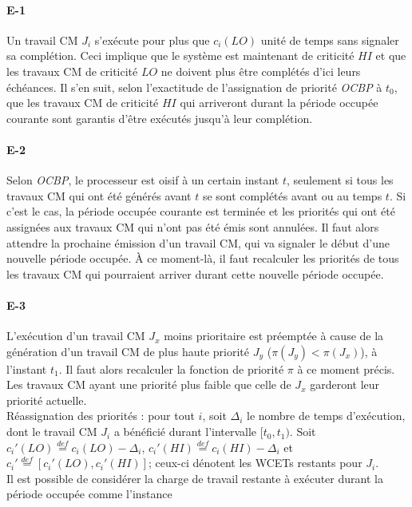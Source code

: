 \documentclass[12pt,a4paper,oneside]{book}
\theoremstyle{break}
\theoremstyle{breakplain}
\begin{document}
\paragraph{E-1}
Un travail CM $J_i$ s'exécute pour plus que $c_i(LO)$ unité de temps sans signaler sa complétion. Ceci implique que le système est maintenant de criticité $HI$ et que les travaux CM de criticité $LO$ ne doivent plus être complétés d'ici leurs échéances. Il s'en suit, selon l'exactitude de l'assignation de priorité \textit{OCBP} à $t_0$, que les travaux CM de criticité $HI$ qui arriveront durant la période occupée courante sont garantis d'être exécutés jusqu'à leur complétion.

\paragraph{E-2}
Selon \textit{OCBP}, le processeur est oisif à un certain instant $t$, seulement si tous les travaux CM qui ont été générés avant $t$ se sont complétés avant ou au temps $t$. Si c'est le cas, la période occupée courante est terminée et les priorités qui ont été assignées aux travaux CM qui n'ont pas été émis sont annulées. Il faut alors attendre la prochaine émission d'un travail CM, qui va signaler le début d'une nouvelle période occupée. À ce moment-là, il faut recalculer les priorités de tous les travaux CM qui pourraient arriver durant cette nouvelle période occupée.

\paragraph{E-3}
L'exécution d'un travail CM $J_x$ moins prioritaire est préemptée à cause de la génération d'un travail CM de plus haute priorité $J_y$ ($\pi(J_y) < \pi(J_x)$), à l'instant $t_1$. Il faut alors recalculer la fonction de priorité $\pi$ à ce moment précis. Les travaux CM ayant une priorité plus faible que celle de $J_x$ garderont leur priorité actuelle.\\

Réassignation des priorités : pour tout $i$, soit $\Delta_i$ le nombre de temps d'exécution, dont le travail CM $J_i$ a bénéficié durant l'intervalle $[t_0, t_1)$. Soit $c_i'(LO) \overset{def}{=} c_i(LO)-\Delta_i$, $c_i'(HI) \overset{def}{=} c_i(HI)-\Delta_i$ et $c_i' \overset{def}{=} [c_i'(LO), c_i'(HI)]$; ceux-ci dénotent les WCETs restants pour $J_i$.\\

Il est possible de considérer la charge de travail restante à exécuter durant la période occupée comme l'instance 
\end{document}
